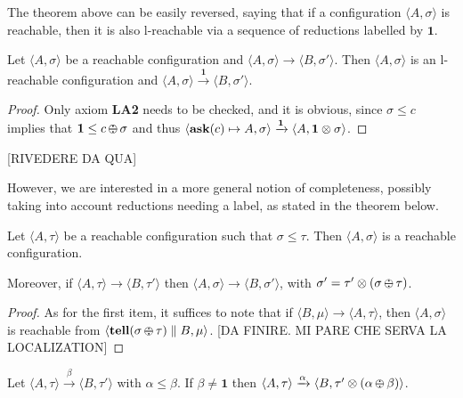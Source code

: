 \documentclass{llncs}
\newcommand{\tell}{{\bf tell}}
\newcommand{\ask}{{\bf ask}}
\def\monid{{\mathbf 0}}
\def\odiv{\, {\ominus\hspace{-7.7pt} \div} \,}
\def\monid{\mathbf{1}}
\begin{document}
The theorem above can be easily reversed, saying that if a configuration $\langle A, \sigma \rangle$ is reachable,
then it is also l-reachable via a sequence of reductions labelled by $\monid$.

\begin{lemma}
Let $\langle A, \sigma \rangle$ be a reachable configuration and
$\langle A, \sigma \rangle \to \langle B, \sigma' \rangle$. 
Then $\langle A, \sigma \rangle$ is an l-reachable configuration and
$\langle A, \sigma \rangle \xrightarrow{\monid}  \langle B, \sigma' \rangle$.
\end{lemma}
\begin{proof}
Only axiom  {\bf LA2} needs to be checked, and it is obvious, since $\sigma \leq c$ implies that 
$\monid \leq c \odiv \sigma$ and thus 
$\langle \hbox{\ask}(c) \mapsto A, \sigma \rangle \xrightarrow{\monid}
  	\langle A, \monid \otimes \sigma \rangle$.
\end{proof}	
	
[RIVEDERE DA QUA]

However, we are interested in a more general notion of completeness, possibly taking into account 
reductions needing a label, as stated in the theorem below.

\begin{lemma}
\label{minor}
Let $\langle A, \tau \rangle$ be a reachable configuration such that
$\sigma \leq \tau$. Then $\langle A, \sigma \rangle$ is a reachable configuration.

Moreover, if  $\langle A, \tau \rangle \to \langle B, \tau' \rangle$ then
$\langle A, \sigma \rangle \to \langle B, \sigma' \rangle$, 
with $\sigma' = \tau' \otimes (\sigma \odiv \tau)$.
\end{lemma}
\begin{proof}
As for the first item, it suffices to note that if
$\langle B, \mu \rangle \to \langle A, \tau \rangle$,
then $\langle A, \sigma \rangle$ is reachable from
 $\langle \hbox{\tell}(\sigma \odiv \tau) \parallel B, \mu \rangle$.
 [DA FINIRE. MI PARE CHE SERVA LA LOCALIZATION]
\end{proof}

\begin{lemma}
\label{riminor}
Let $\langle A, \tau \rangle \xrightarrow{\beta} \langle B, \tau' \rangle$ with $\alpha \leq \beta$. 
%
If $\beta \neq \monid$ then $\langle A, \tau \rangle \xrightarrow{\alpha} \langle B, \tau' \otimes (\alpha \odiv \beta) \rangle$.
%
\end{lemma}
\end{document}
